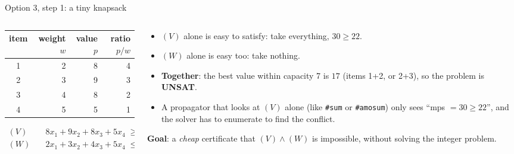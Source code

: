 \documentclass[aspectratio=169,11pt]{beamer}
\begin{document}
\begin{frame}{Option 3, step 1: a tiny knapsack}
\footnotesize
\begin{columns}[T]
\begin{column}{.45\textwidth}
\begin{center}
\begin{tabular}{crrr}\toprule
item & weight $w$ & value $p$ & ratio $p/w$\\\midrule
1 & 2 & 8 & 4\\
2 & 3 & 9 & 3\\
3 & 4 & 8 & 2\\
4 & 5 & 5 & 1\\\bottomrule
\end{tabular}
\end{center}
\[
\begin{aligned}
(V)&\quad 8x_1 + 9x_2 + 8x_3 + 5x_4 \;\ge\; 22 \quad\text{(value)}\\
(W)&\quad 2x_1 + 3x_2 + 4x_3 + 5x_4 \;\le\; 7 \quad\text{(capacity)}
\end{aligned}
\]
\end{column}
\begin{column}{.52\textwidth}
\begin{itemize}\setlength\itemsep{3pt}
\item $(V)$ alone is easy to satisfy: take everything, $30 \ge 22$.
\item $(W)$ alone is easy too: take nothing.
\item \textbf{Together}: the best value within capacity 7 is $17$ (items 1+2, or 2+3), so the problem is \textbf{UNSAT}.
\item A propagator that looks at $(V)$ alone (like \texttt{\#sum} or \texttt{\#amosum}) only sees ``mps $= 30 \ge 22$'', and the
  solver has to enumerate to find the conflict.
\end{itemize}
\vspace{2mm}
\textbf{Goal}: a \emph{cheap} certificate that $(V)\wedge(W)$ is impossible, without solving the integer problem.
\end{column}
\end{columns}
\end{frame}
\end{document}
